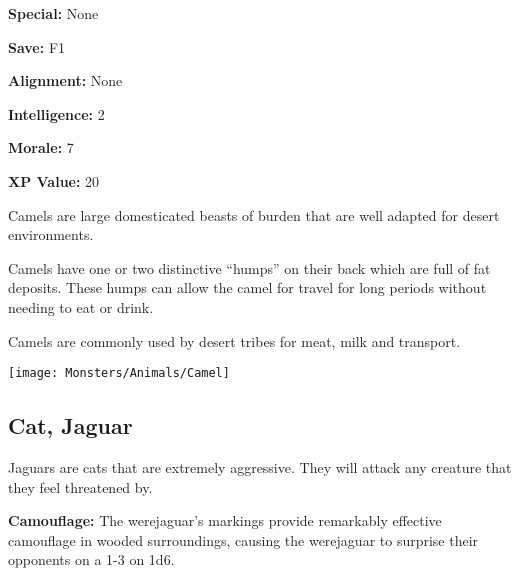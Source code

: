 \begin{multicols*}{2}
{\textbf{Special:} None

\textbf{Save:} F1

\textbf{Alignment:} None

\textbf{Intelligence:} 2

\textbf{Morale:} 7

\textbf{XP Value:} 20}

Camels are large domesticated beasts of burden that are well adapted for desert environments.

Camels have one or two distinctive “humps” on their back which are full of fat deposits. These humps can allow the camel for travel for long periods without needing to eat or drink.

Camels are commonly used by desert tribes for meat, milk and transport.

\texttt{[image: Monsters/Animals/Camel]}

\subsection{Cat, Jaguar}\label{monster:Jaguar}

Jaguars are cats that are extremely aggressive. They will attack any creature that they feel threatened by.

\textbf{Camouflage:} The werejaguar's markings provide remarkably effective camouflage in wooded surroundings, causing the werejaguar to surprise their opponents on a 1-3 on 1d6.


\end{multicols*}

